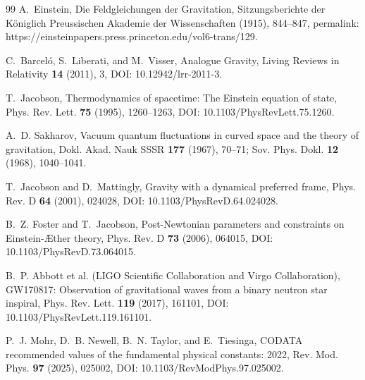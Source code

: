 \documentclass[11pt]{article}
\theoremstyle{definition}
\theoremstyle{plain}
\theoremstyle{remark}
\begin{document}
\begin{thebibliography}{99}
            A.~Einstein,
            \newblock Die Feldgleichungen der Gravitation,
            \newblock Sitzungsberichte der K{\"o}niglich Preussischen Akademie der Wissenschaften (1915), 844--847,
            \newblock permalink: https://einsteinpapers.press.princeton.edu/vol6-trans/129.

            C.~Barcel{\'o}, S.~Liberati, and M.~Visser,
            \newblock Analogue Gravity,
            \newblock Living Reviews in Relativity \textbf{14} (2011), 3,
            \newblock DOI: 10.12942/lrr-2011-3.

            T.~Jacobson,
            \newblock Thermodynamics of spacetime: The Einstein equation of state,
            \newblock Phys. Rev. Lett. \textbf{75} (1995), 1260--1263,
            \newblock DOI: 10.1103/PhysRevLett.75.1260.

            A.~D. Sakharov,
            \newblock Vacuum quantum fluctuations in curved space and the theory of gravitation,
            \newblock Dokl. Akad. Nauk SSSR \textbf{177} (1967), 70--71;
            \newblock Sov. Phys. Dokl. \textbf{12} (1968), 1040--1041.

            T.~Jacobson and D.~Mattingly,
            \newblock Gravity with a dynamical preferred frame,
            \newblock Phys. Rev. D \textbf{64} (2001), 024028,
            \newblock DOI: 10.1103/PhysRevD.64.024028.

            B.~Z. Foster and T.~Jacobson,
            \newblock Post-Newtonian parameters and constraints on Einstein-\AE ther theory,
            \newblock Phys. Rev. D \textbf{73} (2006), 064015,
            \newblock DOI: 10.1103/PhysRevD.73.064015.

            B.~P. Abbott et al. (LIGO Scientific Collaboration and Virgo Collaboration),
            \newblock GW170817: Observation of gravitational waves from a binary neutron star inspiral,
            \newblock Phys. Rev. Lett. \textbf{119} (2017), 161101,
            \newblock DOI: 10.1103/PhysRevLett.119.161101.

            P.~J. Mohr, D.~B. Newell, B.~N. Taylor, and E.~Tiesinga,
            \newblock CODATA recommended values of the fundamental physical constants: 2022,
            \newblock Rev. Mod. Phys. \textbf{97} (2025), 025002,
            \newblock DOI: 10.1103/RevModPhys.97.025002.


\end{thebibliography}
\end{document}
